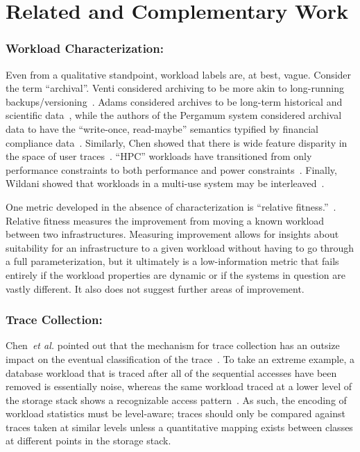 
\section{Related and Complementary Work}%
\label{sec:related}

\subsubsection*{Workload Characterization: }

Even from a qualitative standpoint, workload labels are, at best, vague.
Consider the term ``archival''. Venti considered archiving to be more akin to
long-running backups/versioning~\cite{venti}. Adams \etal considered
archives to be long-term historical and scientific data~\cite{ian-tos}, while
the authors of the Pergamum system considered archival data to have the ``write-once,
read-maybe'' semantics typified by financial compliance data~\cite{storerfast2008}.
Similarly, Chen \etal showed that there is wide feature disparity in the space
of user traces~\cite{chen-kmeans}.  ``HPC'' workloads have transitioned from
only performance constraints to both performance and power
constraints~\cite{hpcpower}.  Finally, Wildani \etal showed that workloads
in a multi-use system may be interleaved~\cite{hands}. 

One metric developed in the absence of characterization is ``relative
fitness.''~\cite{mesnier07}.  Relative fitness measures the improvement from
moving a known workload between two infrastructures.  Measuring improvement
allows for insights about suitability for an infrastructure to a given workload
without having to go through a full parameterization, but it ultimately is a
low-information metric that fails entirely if the workload properties are
dynamic or if the systems in question are vastly different.  It also does not
suggest further areas of improvement.

\subsubsection*{Trace Collection: }
Chen~\emph{et al.} pointed out that
the mechanism for trace collection has an outsize impact on the eventual
classification of the trace~\cite{chen-kmeans}.  To take an extreme
example, a database workload that is traced after all of the sequential accesses
have been removed is essentially noise, whereas the same workload traced at a
lower level of the storage stack shows a recognizable access
pattern~\cite{hands}.  As such, the encoding of workload statistics must be
level-aware; traces should only be compared against traces taken at similar
levels unless a quantitative mapping exists between classes at different points
in the storage stack.  


